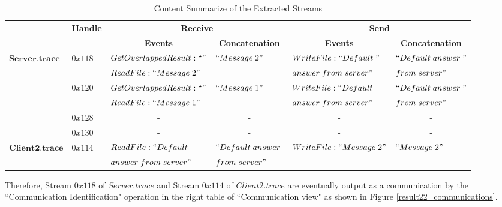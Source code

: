 \begin{table}[H]
  \tiny
  \centering
  \caption{Content Summarize of the Extracted Streams}
  \label{contentresult22}
  \begin{tabular}{|l|l|l|l|l|l|}
\hline            
& \multirow{2}{*}{\textbf{Handle}} & \multicolumn{2}{c|}{\textbf{Receive} }&\multicolumn{2}{c|}{\textbf{Send}} \\
\cline{3-6}
& &\multicolumn{1}{c|}{ \textbf{Events} }&\multicolumn{1}{c|}{\textbf{ Concatenation}}&\multicolumn{1}{c|}{ \textbf{Events} }&\multicolumn{1}{c|}{\textbf{ Concatenation}}\\
\hline 
\multirow{6}{*}{$\boldsymbol{Server.trace}$} &\multirow{2}{*}{$0x118$} & $GetOverlappedResult:``"$ & \multirow{2}{*}{$``Message\; 2"$} & $WriteFile:``Default\; "$ &  $``Default\; answer\; "$\\
\cline{3-3}
& &$ReadFile:``Message\; 2"$ &  & $answer\; from\; server"$&$from\; server"$\\
\cline{2-6}    
      &\multirow{2}{*}{$0x120$} & $GetOverlappedResult:``"$ & \multirow{2}{*}{$``Message\; 1"$} & $WriteFile:``Default\; $ &  $``Default\; answer\; "$\\
\cline{3-3}
& &$ReadFile:``Message\; 1"$ & &$answer\; from\; server"$ &$from\; server"$\\  
\cline{2-6}   
& $0x128$&\multicolumn{1}{c|}{- }&\multicolumn{1}{c|}{- } &\multicolumn{1}{c|}{- } &\multicolumn{1}{c|}{- }\\  
\cline{2-6}   
& $0x130$&\multicolumn{1}{c|}{- } &\multicolumn{1}{c|}{- } &\multicolumn{1}{c|}{- } &\multicolumn{1}{c|}{- }\\      
\hline  
\multirow{2}{*}{$\boldsymbol{Client2.trace}$ }&\multirow{2}{*}{$0x114$ }& $ReadFile: ``Default\; $ & $``Default\; answer\; $ & \multirow{2}{*}{$WriteFile:``Message\; 2"$ } &  \multirow{2}{*}{$``Message\; 2"$}\\
& &$answer\; from\; server"$& $ from\; server"$ & &\\
\hline
  \end{tabular}
\end{table}



Therefore, Stream $0x118$ of $Server.trace$ and Stream $0x114$ of $Client2.trace$ are eventually output as a communication by the ``Communication Identification" operation in the right table of ``Communication view" as shown in Figure \ref{result22_communications}. 

